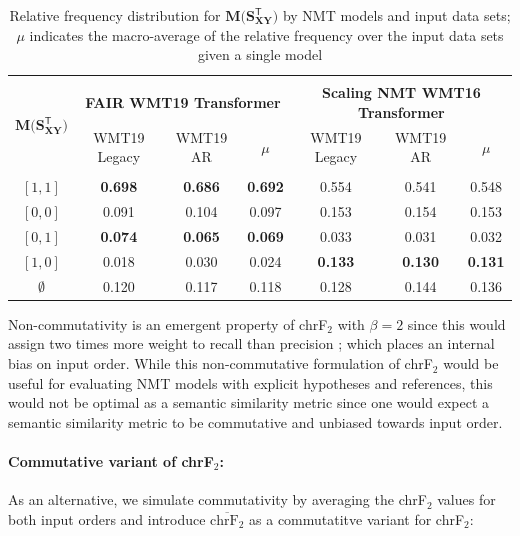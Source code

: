 \documentclass[11pt,a4paper]{article}
\begin{document}
\begin{table}[t!]
  \centering
  \begin{tabular*}{\textwidth}{c @{\extracolsep{\fill}} cccccc}
    \hline \\[-10pt]
    \multirow{2}[3]{*}{$\mathbf{M(S_{XY}^{\mathsf{T}}})$} & \multicolumn{3}{c}{\textbf{FAIR WMT19 Transformer}} & \multicolumn{3}{c}{\textbf{Scaling NMT WMT16 Transformer}} \\
    \cmidrule(lr){2-4} \cmidrule(lr){5-7}
    & WMT19 Legacy & WMT19 AR & $\mu$ & WMT19 Legacy & WMT19 AR & $\mu$ \\[3pt]
    \hline \hline \\[-10pt]
    $[1,1]$ & \textbf{0.698} & \textbf{0.686} & \textbf{0.692} & 0.554 & 0.541 & 0.548 \\
    $[0,0]$ & 0.091 & 0.104 & 0.097 & 0.153 & 0.154 & 0.153 \\
    $[0,1]$ & \textbf{0.074} & \textbf{0.065} & \textbf{0.069} & 0.033 & 0.031 & 0.032 \\
    $[1,0]$ & 0.018 & 0.030 & 0.024 & \textbf{0.133} & \textbf{0.130} & \textbf{0.131}\\
    $\emptyset$ & 0.120 & 0.117 & 0.118 & 0.128 & 0.144 & 0.136 \\
    \hline
  \end{tabular*}
  \caption{Relative frequency distribution for $\mathbf{M(S_{XY}^{\mathsf{T}}})$ by NMT models and input data sets; $\mu$ indicates the macro-average of the relative frequency over the input data sets given a single model}
  \label{isometry_frequency}
\end{table}

Non-commutativity is an emergent property of chrF$_2$ with $\beta = 2$ since this would assign two times more weight to recall than precision \cite{popovic2015chrf}; which places an internal bias on input order. While this non-commutative formulation of chrF$_2$ would be useful for evaluating NMT models with explicit hypotheses and references, this would not be optimal as a semantic similarity metric since one would expect a semantic similarity metric to be commutative and unbiased towards input order.

\paragraph{Commutative variant of chrF$_2$:} As an alternative, we simulate commutativity by averaging the chrF$_2$ values for both input orders and introduce $\overline{\text{chrF}_2}$ as a commutatitve variant for chrF$_2$:
\end{document}
